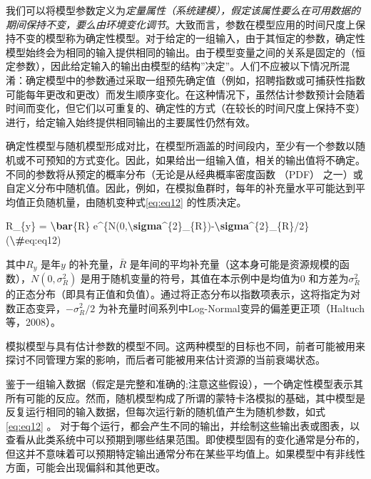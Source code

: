 \documentclass[
  lang=cn,
  11pt,
  scheme=chinese,
  chinesefont=nofont,
  citestyle=gb7714-2015,
  bibstyle=gb7714-2015]{elegantbook}
\newenvironment{Shaded}{\begin{snugshade}}{\end{snugshade}}
\newcommand{\FunctionTok}[1]{\textcolor[rgb]{0.13,0.29,0.53}{\textbf{#1}}}
\newcommand{\NormalTok}[1]{#1}
\begin{document}
我们可以将模型参数定义为\emph{定量属性（系统建模），假定该属性要么在可用数据的期间保持不变，要么由环境变化调节}。大致而言，参数在模型应用的时间尺度上保持不变的模型称为确定性模型。对于给定的一组输入，由于其恒定的参数，确定性模型始终会为相同的输入提供相同的输出。由于模型变量之间的关系是固定的（恒定参数），因此给定输入的输出由模型的结构''决定''。人们不应被以下情况所混淆：确定模型中的参数通过采取一组预先确定值（例如，招聘指数或可捕获性指数可能每年更改和更改）而发生顺序变化。在这种情况下，虽然估计参数预计会随着时间而变化，但它们以可重复的、确定性的方式（在较长的时间尺度上保持不变）进行，给定输入始终提供相同输出的主要属性仍然有效。

确定性模型与随机模型形成对比，在模型所涵盖的时间段内，至少有一个参数以随机或不可预知的方式变化。因此，如果给出一组输入值，相关的输出值将不确定。不同的参数将从预定的概率分布（无论是从经典概率密度函数 （PDF） 之一）或自定义分布中随机值。因此，例如，在模拟鱼群时，每年的补充量水平可能达到平均值正负随机量，由随机变种式\eqref{eq:eq12} 的性质决定。

\begin{Shaded}
\begin{Highlighting}[]
\NormalTok{R\_\{y\} = }\FunctionTok{\textbackslash{}bar}\NormalTok{\{R\} e\^{}\{N(0,}\FunctionTok{\textbackslash{}sigma}\NormalTok{\^{}\{2\}\_\{R\}){-}}\FunctionTok{\textbackslash{}sigma}\NormalTok{\^{}\{2\}\_\{R\}/2\}}
\NormalTok{(}\FunctionTok{\textbackslash{}\#}\NormalTok{eq:eq12)}
\end{Highlighting}
\end{Shaded}

其中\(R_y\) 是年\(y\) 的补充量，\(\bar R\) 是年间的平均补充量（这本身可能是资源规模的函数），\(N(0, \sigma_R^2)\) 是用于随机变量的符号，其值在本示例中是均值为0 和方差为\(\sigma^2_R\) 的正态分布（即具有正值和负值）。通过将正态分布以指数项表示，这将指定为对数正态变异，\(-\sigma_R^2/2\) 为补充量时间系列中Log-Normal变异的偏差更正项（Haltuch等，2008）。

模拟模型与具有估计参数的模型不同。这两种模型的目标也不同，前者可能被用来探讨不同管理方案的影响，而后者可能被用来估计资源的当前衰竭状态。

鉴于一组输入数据（假定是完整和准确的;注意这些假设），一个确定性模型表示其所有可能的反应。然而，随机模型构成了所谓的蒙特卡洛模拟的基础，其中模型是反复运行相同的输入数据，但每次运行新的随机值产生为随机参数，如式 \eqref{eq:eq12} 。 对于每个运行，都会产生不同的输出，并绘制这些输出表或图表，以查看从此类系统中可以预期到哪些结果范围。即使模型固有的变化通常是分布的，但这并不意味着可以预期特定输出通常分布在某些平均值上。如果模型中有非线性方面，可能会出现偏斜和其他更改。
\end{document}
